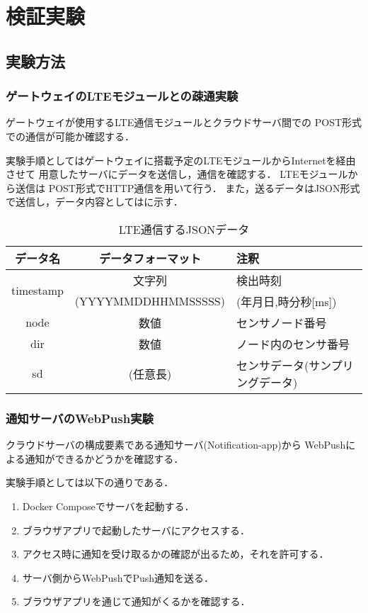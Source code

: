\documentclass[12pt]{honka_v1}
\begin{document}
\fi
\section{検証実験}
\subsection{実験方法}
\subsubsection{ゲートウェイのLTEモジュールとの疎通実験}
ゲートウェイが使用するLTE通信モジュールとクラウドサーバ間での
POST形式での通信が可能か確認する．

実験手順としてはゲートウェイに搭載予定のLTEモジュールからInternetを経由させて
用意したサーバにデータを送信し，通信を確認する．
LTEモジュールから送信は
POST形式でHTTP通信を用いて行う．
また，送るデータはJSON形式で送信し，データ内容としてはに示す．

\begin{table}[htbp]
    \caption{LTE通信するJSONデータ}
    \label{tb:lte-json}
    \centering
    \begin{tabular}{c|c|l}\hline
        データ名 & データフォーマット & 注釈 \\
        \hline
        \multirow{2}{*}{timestamp} & 文字列 & 検出時刻 \\
        & {\footnotesize(YYYYMMDDHHMMSSSSS)} & {\footnotesize(年月日,時分秒[ms])} \\
        node & 数値 & センサノード番号 \\
        dir & 数値 & ノード内のセンサ番号 \\
        sd & (任意長) & センサデータ{\footnotesize(サンプリングデータ)} \\
        \hline
    \end{tabular}
\end{table}


\subsubsection{通知サーバのWebPush実験}
クラウドサーバの構成要素である通知サーバ(Notification-app)から
WebPushによる通知ができるかどうかを確認する．

実験手順としては以下の通りである．
\begin{enumerate}
    \item Docker Composeでサーバを起動する．
    \item ブラウザアプリで起動したサーバにアクセスする．
    \item アクセス時に通知を受け取るかの確認が出るため，それを許可する．
    \item サーバ側からWebPushでPush通知を送る．
    \item ブラウザアプリを通じて通知がくるかを確認する．
\end{enumerate}
\end{document}
